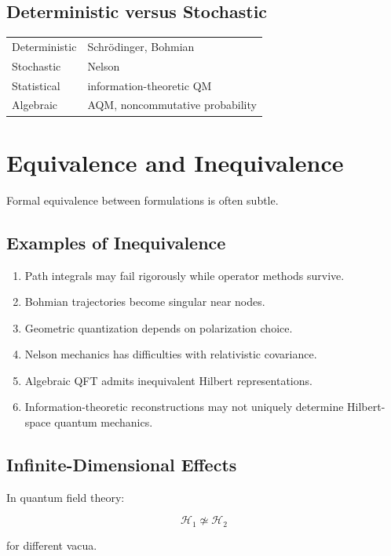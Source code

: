\documentclass[11pt]{article}
\begin{document}
\subsection{Deterministic versus Stochastic}

\begin{center}
\begin{tabular}{ll}
Deterministic & Schr\"odinger, Bohmian \\
Stochastic & Nelson \\
Statistical & information-theoretic QM \\
Algebraic & AQM, noncommutative probability
\end{tabular}
\end{center}

\section{Equivalence and Inequivalence}

Formal equivalence between formulations is often subtle.

\subsection{Examples of Inequivalence}

\begin{enumerate}
\item Path integrals may fail rigorously while operator methods survive.
\item Bohmian trajectories become singular near nodes.
\item Geometric quantization depends on polarization choice.
\item Nelson mechanics has difficulties with relativistic covariance.
\item Algebraic QFT admits inequivalent Hilbert representations.
\item Information-theoretic reconstructions may not uniquely determine Hilbert-space quantum mechanics.
\end{enumerate}

\subsection{Infinite-Dimensional Effects}

In quantum field theory:

\[
\mathcal H_1 \not\simeq \mathcal H_2
\]

for different vacua.
\end{document}
